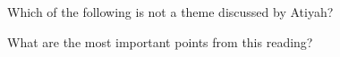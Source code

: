 \documentclass[nooutcomes]{ximera}
\begin{document}
\begin{question}
Which of the following is not a theme discussed by Atiyah?
\begin{multipleChoice}
\end{multipleChoice}
\end{question}


\begin{question}
What are the most important points from this reading?
\begin{freeResponse}
\end{freeResponse}

\end{question}
\end{document}
